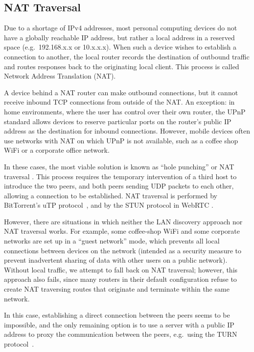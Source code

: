 \documentclass[sigplan,10pt]{acmart}
\begin{document}
\subsection{NAT Traversal}\label{sec:nat-traversal}

Due to a shortage of IPv4 addresses, most personal computing devices do not have a globally reachable IP address, but rather a local address in a reserved space (e.g.\ 192.168.x.x or 10.x.x.x).
When such a device wishes to establish a connection to another, the local router records the destination of outbound traffic and routes responses back to the originating local client.
This process is called Network Address Translation (NAT).

A device behind a NAT router can make outbound connections, but it cannot receive inbound TCP connections from outside of the NAT.
An exception: in home environments, where the user has control over their own router, the UPnP standard allows devices to reserve particular ports on the router's public IP address as the destination for inbound connections.
However, mobile devices often use networks with NAT on which UPnP is not available, such as a coffee shop WiFi or a corporate office network.

In these cases, the most viable solution is known as ``hole punching'' or NAT traversal \cite{Ford:2005vj}.
This process requires the temporary intervention of a third host to introduce the two peers, and both peers sending UDP packets to each other, allowing a connection to be established.
NAT traversal is performed by BitTorrent's uTP protocol~\cite{BEP29}, and by the STUN protocol in WebRTC \cite{RFC5389}.

However, there are situations in which neither the LAN discovery approach nor NAT traversal works.
For example, some coffee-shop WiFi and some corporate networks are set up in a ``guest network'' mode, which prevents all local connections between devices on the network (intended as a security measure to prevent inadvertent sharing of data with other users on a public network).
Without local traffic, we attempt to fall back on NAT traversal; however, this approach also fails, since many routers in their default configuration refuse to create NAT traversing routes that originate and terminate within the same network.

In this case, establishing a direct connection between the peers seems to be impossible, and the only remaining option is to use a server with a public IP address to proxy the communication between the peers, e.g.\ using the TURN protocol~\cite{RFC5766}.
\end{document}
